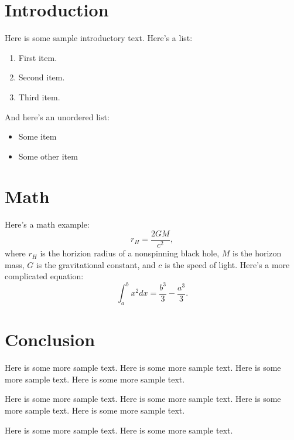 \documentclass{article}
\begin{document}
\section{Introduction}
Here is some sample introductory text. Here's a list:
\begin{enumerate}
\item First item.
\item Second item.
\item Third item.
\end{enumerate}
And here's an unordered list:
\begin{itemize}
\item Some item
\item Some other item
\end{itemize}
\section{Math}
Here's a math example:
\begin{equation}
r_H = \frac{2 G M}{c^2},
\end{equation} where $r_H$ is the horizion radius 
of a nonspinning black hole, $M$ is the horizon mass, $G$ is the gravitational constant, and $c$ is the speed of light. Here's 
a more complicated equation:
\begin{equation}
\int_a^b x^2 dx = \frac{b^3}{3} - \frac{a^3}{3}.
\end{equation}
\section{Conclusion}
Here is some more sample text. Here is some more sample text. Here is some more sample text. Here is some more sample text.

Here is some more sample text. Here is some more sample text. Here is some more sample text. Here is some more sample text.

Here is some more sample text. Here is some more sample text.
\end{document}

